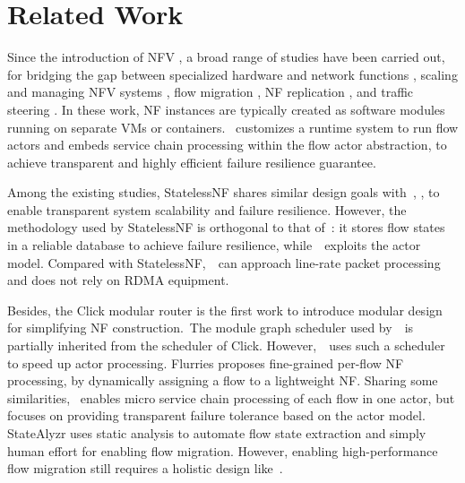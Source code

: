 \section{Related Work}
\label{sec:relatedwork}

Since the introduction of NFV \cite{nfv-white-paper}, a broad range of studies have been carried out, for bridging the gap between specialized hardware and network functions \cite{hwang2015netvm, Han:EECS-2015-155, martins2014clickos, 199352}, scaling and managing NFV systems \cite{gember2012stratos, palkar2015e2}, flow migration \cite{rajagopalan2013split, khalid2016paving, gember2015opennf}, NF replication \cite{rajagopalan2013pico, sherry2015rollback}, and traffic steering \cite{simplifying}. In these work, NF instances are typically created as software modules running on separate VMs or containers. \nfactor~customizes a runtime system to run flow actors and embeds service chain processing within the flow actor abstraction, to achieve transparent and highly efficient failure resilience guarantee.


Among the existing studies, StatelessNF \cite{201545} shares similar design goals with~\nfactor, \ie, to enable transparent system scalability and failure resilience. However, the methodology used by StatelessNF is orthogonal to that of~\nfactor: it stores flow states in a reliable database \cite{ongaro2011fast} to achieve failure resilience, while~\nfactor~exploits the actor model. Compared with StatelessNF,~\nfactor~can approach line-rate packet processing and does not rely on RDMA equipment.

Besides, the Click modular router \cite{kohler2000click} is the first work to introduce modular design for simplifying NF construction.~The module graph scheduler used by~\nfactor~is partially inherited from the scheduler of Click. However,~\nfactor~uses such a scheduler to speed up actor processing. Flurries \cite{zhang2016flurries} proposes fine-grained per-flow NF processing, by dynamically assigning a flow to a lightweight NF. Sharing some similarities, \nfactor~enables micro service chain processing of each flow in one actor, but focuses on providing transparent failure tolerance based on the actor model. %
StateAlyzr \cite{khalid2016paving} uses static analysis to automate flow state extraction and simply human effort for enabling flow migration. However, enabling high-performance flow migration still requires a holistic design like~\nfactor.

